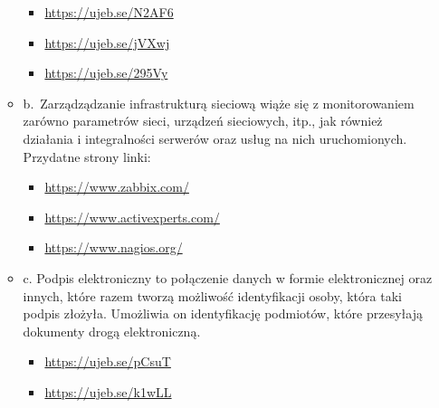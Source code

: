 \documentclass[12pt]{article}
\renewcommand{\_}{\kern-1.5pt\textunderscore\kern-1.5pt}
\begin{document}
\begin{itemize}
\begin{itemize}
\begin{itemize}
	\item \href{https://ujeb.se/N2AF6}{https://ujeb.se/N2AF6}\par

	\item \href{https://ujeb.se/jVXwj}{https://ujeb.se/jVXwj}\par

	\item \href{https://ujeb.se/295Vy}{https://ujeb.se/295Vy}\par


\end{itemize}
	\item b.\ Zarządządzanie infrastrukturą sieciową wiąże się z monitorowaniem zarówno parametrów sieci, urządzeń sieciowych, itp., jak również działania i integralności  \tab serwerów oraz usług na nich uruchomionych.\\
 Przydatne strony linki:\par

\begin{itemize}
	\item \href{https://www.zabbix.com/}{https://www.zabbix.com/}\par

	\item \href{https://www.activexperts.com/}{https://www.activexperts.com/}\par

	\item \href{https://www.nagios.org/}{https://www.nagios.org/}\par


\end{itemize}
	\item c. Podpis elektroniczny to połączenie danych w formie elektronicznej oraz innych, które razem tworzą możliwość identyfikacji osoby, która taki podpis złożyła. Umożliwia on identyfikację podmiotów, które przesyłają dokumenty drogą elektroniczną.\par

\begin{itemize}
	\item \href{https://ujeb.se/pCsuT}{https://ujeb.se/pCsuT}\par

	\item \href{https://ujeb.se/k1wLL}{https://ujeb.se/k1wLL}\\

\end{itemize}
\end{itemize}
\end{itemize}\par
\end{document}
